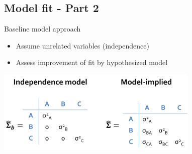 \documentclass[10pt]{beamer}\usepackage[]{graphicx}\usepackage[]{xcolor}
\begin{document}
%
\subsection*{Model fit - Part 2}
%
\begin{frame}{Baseline model approach}
\begin{itemize}
  \item{Assume unrelated variables (independence)}
  \item{Assess improvement of fit by hypothesized model}
\end{itemize}
\vspace*{5mm}
\includegraphics[height=4cm,keepaspectratio=T] {independence_vs_model.png}
\end{frame}
%
\end{document}
